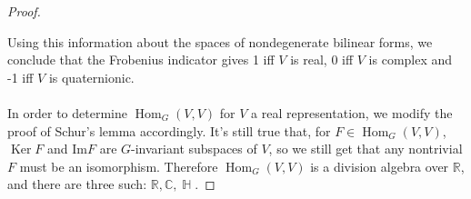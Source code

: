 \documentclass[12 pt]{article}
\newcommand{\R}{\mathbb{R}}
\newcommand{\C}{\mathbb{C}}
\DeclareMathOperator{\Ker}{Ker}
\DeclareMathOperator{\Hom}{Hom}
\DeclareMathOperator {\HH} {\mathbb{H}}
\begin{document}
\begin{proof}
{\begin{enumerate} [(i)]
\end{enumerate}}
Using this information about the spaces of nondegenerate bilinear forms, we conclude that the Frobenius indicator gives 1 iff $V$ is real, 0 iff $V$ is complex and -1 iff $V$ is quaternionic.
\\
\\
In order to determine $\Hom_G(V,V)$ for $V$ a real representation, we modify the proof of Schur's lemma accordingly. It's still true that, for $F \in \Hom_G(V,V)$, $\Ker F$ and $\text{Im} F$ are $G$-invariant subspaces of $V$, so we still get that any nontrivial $F$ must be an isomorphism. Therefore $\Hom_G (V,V)$ is a division algebra over $\R$, and there are three such: $\R, \C, \HH$.


\end{proof}
\end{document}
